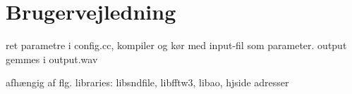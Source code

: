 \section{Brugervejledning}

ret parametre i config.cc, kompiler og kør med input-fil som parameter. output gemmes i output.wav

afhængig af flg. libraries: libsndfile, libfftw3, libao, hjside adresser

